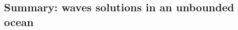 \documentclass[a4paper,11pt]{article}
\begin{document}

\subsection{Summary: waves solutions in an unbounded ocean}
\label{SubSectionUsualDisp}
\end{document}
